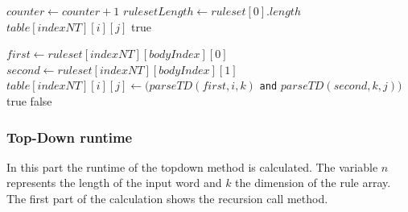 \documentclass[a4paper, 11pt]{article}
\begin{document}
\begin{center}
\label{alg:cap}
\begin{algorithmic}[1]
\State $counter \gets counter+1$
\State $rulesetLength \gets ruleset[0].length$
\State \Return $table[indexNT][i][j]$
\EndIf
{}
\State \Return true
\EndIf
\EndFor

\Else
{}
\State $first \gets ruleset[indexNT][bodyIndex][0]$
\State $second \gets ruleset[indexNT][bodyIndex][1]$
\State $table[indexNT][i][j] \gets (parseTD(first,i,k)$ \texttt{and} $parseTD(second,k,j))$
\State \Return true
\EndIf
\EndFor
\EndIf
\EndFor
\EndIf
\State \Return false
\end{algorithmic}
\hrulefill
\end{center}

\subsubsection{Top-Down runtime}
\label{topdownruntime}

In this part the runtime of the topdown method is calculated.
The variable $n$ represents the length of the input word and $k$ the dimension of the rule array. The first part of the calculation shows the recursion call method.
\end{document}
